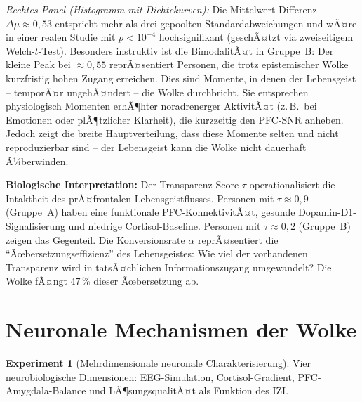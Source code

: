 ﻿\documentclass[12pt,a4paper]{report}
\theoremstyle{plain}
\theoremstyle{definition}
\newtheorem{experiment}[theorem]{Experiment}
\theoremstyle{remark}
\begin{document}
	\textit{Rechtes Panel (Histogramm mit Dichtekurven):}
	Die Mittelwert-Differenz $\Delta\mu \approx 0{,}53$ entspricht mehr als drei
	gepoolten Standardabweichungen und wÃ¤re in einer realen Studie
	mit $p < 10^{-4}$ hochsignifikant (geschÃ¤tzt via zweiseitigem
	Welch-$t$-Test). Besonders instruktiv ist die BimodalitÃ¤t in Gruppe~B:
	Der kleine Peak bei $\approx 0{,}55$ reprÃ¤sentiert Personen, die
	trotz epistemischer Wolke kurzfristig hohen Zugang erreichen.
	Dies sind Momente, in denen der Lebensgeist -- temporÃ¤r ungehÃ¤ndert --
	die Wolke durchbricht. Sie entsprechen physiologisch Momenten erhÃ¶hter
	noradrenerger AktivitÃ¤t (z.\,B.\ bei Emotionen oder plÃ¶tzlicher
	Klarheit), die kurzzeitig den PFC-SNR anheben.
	Jedoch zeigt die breite Hauptverteilung, dass diese Momente selten und nicht
	reproduzierbar sind -- der Lebensgeist kann die Wolke nicht dauerhaft Ã¼berwinden.
	
	\textbf{Biologische Interpretation:}
	Der Transparenz-Score $\tau$ operationalisiert die Intaktheit des prÃ¤frontalen
	Lebensgeistflusses. Personen mit $\tau \approx 0{,}9$ (Gruppe~A) haben eine
	funktionale PFC-KonnektivitÃ¤t, gesunde Dopamin-D1-Signalisierung und niedrige
	Cortisol-Baseline. Personen mit $\tau \approx 0{,}2$ (Gruppe~B) zeigen das
	Gegenteil. Die Konversionsrate $\alpha$ reprÃ¤sentiert die
	``Ãœbersetzungseffizienz'' des Lebensgeistes: Wie viel der vorhandenen
	Transparenz wird in tatsÃ¤chlichen Informationszugang umgewandelt?
	Die Wolke fÃ¤ngt $47\,\%$ dieser Ãœbersetzung ab.
	
	\section{Neuronale Mechanismen der Wolke}
	
	\begin{experiment}[Mehrdimensionale neuronale Charakterisierung]
		Vier neurobiologische Dimensionen: EEG-Simulation, Cortisol-Gradient,
		PFC-Amygdala-Balance und LÃ¶sungsqualitÃ¤t als Funktion des IZI.
	\end{experiment}
	
\end{document}
